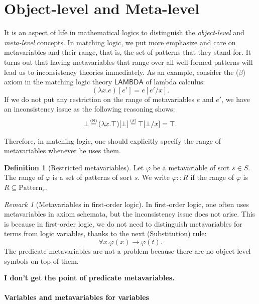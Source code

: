 \documentclass[UTF8]{article}
\newcommand{\comment}[1]
    {\par {\bfseries \color{blue} #1 \par}} %
\newcounter{thmcounter}
\theoremstyle{plain}
\theoremstyle{definition}
\newtheorem{definition}[thmcounter]{Definition}
\theoremstyle{remark}
\newtheorem{remark}[thmcounter]{Remark}
\newcommand{\LAMBDA}{\mathsf{LAMBDA}}
\newcommand{\xeq}[1]
    {\stackrel{\mathclap{\normalfont\tiny\mbox{#1}}}{=}}
\begin{document}
\section{Object-level and Meta-level}

It is an aspect of life in mathematical logics to distinguish the \emph{object-level} and \emph{meta-level} concepts. In matching logic, we put more emphasize and care on metavariables and their range, that is, the set of patterns that they stand for. It turns out that having metavariables that range over all well-formed patterns will lead us to inconsistency theories immediately. As an example, consider the ($\beta$) axiom in the matching logic theory $\LAMBDA$ of lambda calculus:
\begin{equation*}
(\lambda x . e) [e'] = e[e' / x].
\end{equation*}
If we do not put any restriction on the range of metavariables $e$ and $e'$, we have an inconsistency issue as the following reasoning shows:
\begin{align*}
\bot \xeq{(N)} (\lambda x . \top)[\bot] \xeq{($\beta$)} \top[\bot / x] = \top.
\end{align*}

Therefore, in matching logic, one should explicitly specify the range of metavariables whenever he uses them.

\begin{definition}[Restricted metavariables]
	Let $\varphi$ be a metavariable of sort $s \in S$. The range of $\varphi$ is a set of patterns of sort $s$. We write $\varphi :: R$ if the range of $\varphi$ is $R \subseteq \mathrm{Pattern}_s$.
\end{definition}

\begin{remark}[Metavariables in first-order logic]
In first-order logic, one often uses metavariables in axiom schemata, but the inconsistency issue does not arise. This is because in first-order logic, we do not need to distinguish metavariables for terms from logic variables, thanks to the next (Substitution) rule:
\begin{equation*}
\forall x . \varphi(x) \to \varphi(t).
\end{equation*}
The predicate metavariables are not a problem because there are no object level symbols on top of them. \comment{I don't get the point of predicate metavariables.}
\end{remark}

\paragraph{Variables and metavariables for variables}
\end{document}
